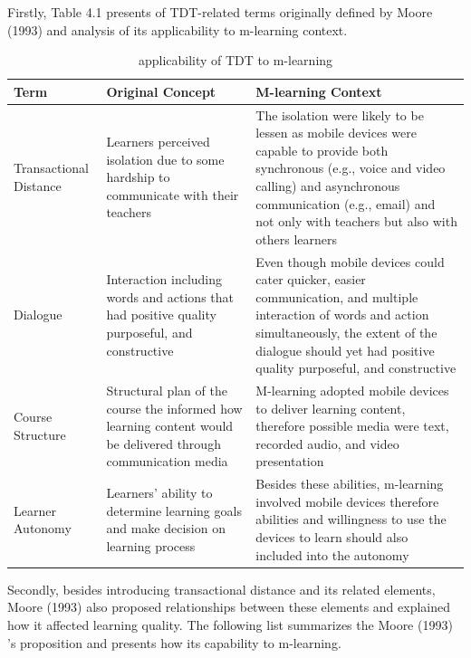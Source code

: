 Firstly, Table 4.1 presents of TDT-related terms originally defined by Moore (1993) \cite{moore1993theory} and analysis of its applicability to m-learning context. 
\newpage 
\begin{table}[H]
\centering
\caption{applicability of TDT to m-learning}
\begin{tabular}{ |p{2.3cm}|p{4 cm}|p{6.2 cm}|} 
 \hline
Term & Original Concept \cite{moore1993theory} & M-learning Context  \\ 
\hline
Transactional Distance & Learners perceived isolation due to some hardship to communicate with their teachers & The isolation were likely to be lessen as mobile devices were capable to provide both synchronous (e.g., voice and video calling) and asynchronous communication (e.g., email) and not only with teachers but also with others learners  \\ 
\hline
 Dialogue & Interaction including words and actions that had positive quality purposeful, and constructive  & Even though mobile devices could cater quicker, easier communication, and multiple interaction of words and action simultaneously, the extent of the dialogue should yet had positive quality purposeful, and constructive \\ 
 \hline
 Course Structure & Structural plan of the course the informed how learning content would be delivered through communication media & M-learning adopted mobile devices to deliver learning content, therefore possible media were text, recorded audio, and video presentation \\ 
\hline
 Learner Autonomy & Learners' ability to determine learning goals and make decision on learning process & Besides these abilities, m-learning involved mobile devices therefore abilities and willingness to use the devices to learn should also included into the autonomy \\ 
 \hline
\end{tabular}
\end{table}
\newpage 
Secondly, besides introducing transactional distance and its related elements, Moore (1993) \cite{moore1993theory} also proposed relationships between these elements and explained how it affected learning quality. The following list summarizes the Moore (1993) \cite{moore1993theory}'s proposition and presents how its capability to m-learning. 

